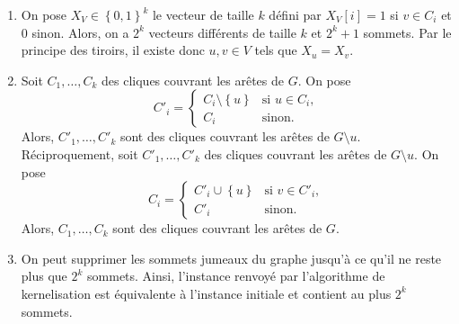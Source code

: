\begin{td-sol}
    \begin{enumerate}
        \item On pose \(X_V \in {\left\{0, 1\right\}}^k\) le vecteur de taille \(k\) d\'efini par \(X_V[i] = 1\) si \(v \in C_i\) et \(0\) sinon.
        Alors, on a \(2^k\) vecteurs diff\'erents de taille \(k\) et \(2^k + 1\) sommets.
        Par le principe des tiroirs, il existe donc \(u, v \in V\) tels que \(X_u = X_v\).

        \item Soit \(C_1,\ldots,C_k\) des cliques couvrant les ar\^etes de \(G\).
        On pose
        \begin{equation*}
            C'_i = \begin{cases}
                C_i \setminus \left\{ u \right\} & \text{si } u \in C_i,\\
                C_i & \text{sinon.}
            \end{cases}
        \end{equation*}
        Alors, \(C'_1,\ldots,C'_k\) sont des cliques couvrant les ar\^etes de \(G \setminus u\).
        R\'eciproquement, soit \(C'_1,\ldots,C'_k\) des cliques couvrant les ar\^etes de \(G \setminus u\).
        On pose
        \begin{equation*}
            C_i = \begin{cases}
                C'_i \cup \left\{ u \right\} & \text{si } v \in C'_i,\\
                C'_i & \text{sinon.}
            \end{cases}
        \end{equation*}
        Alors, \(C_1,\ldots,C_k\) sont des cliques couvrant les ar\^etes de \(G\).
    
        \item On peut supprimer les sommets jumeaux du graphe jusqu'\`a ce qu'il ne reste plus que \(2^k\) sommets.
        Ainsi, l'instance renvoy\'e par l'algorithme de kernelisation est \'equivalente \`a l'instance initiale et contient au plus \(2^k\) sommets.
    \end{enumerate}
\end{td-sol}

